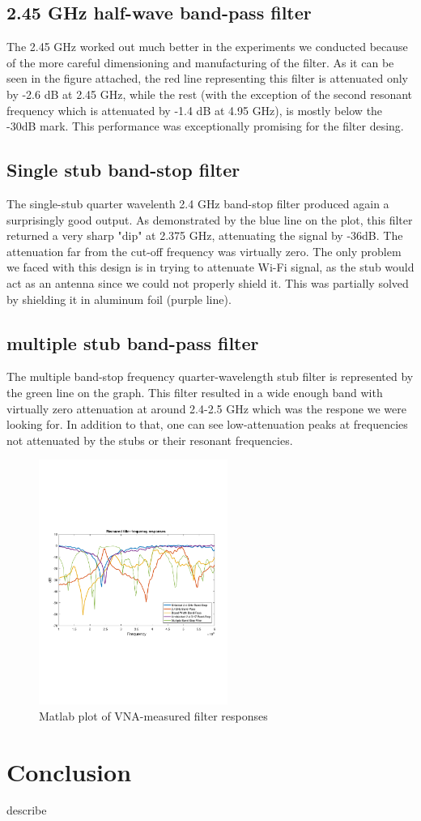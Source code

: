 \documentclass[letterpaper, 11pt, twocolumn]{article}
\begin{document}
\subsection{2.45 GHz half-wave band-pass filter}
The 2.45 GHz worked out much better in the experiments we conducted because of the more careful dimensioning and manufacturing of the filter. As it can be seen in the figure attached, the red line representing this filter is attenuated only by -2.6 dB at 2.45 GHz, while the rest (with the exception of the second resonant frequency which is attenuated by -1.4 dB at 4.95 GHz), is mostly below the -30dB mark. This performance was exceptionally promising for the filter desing.  


\subsection{Single stub band-stop filter}
The single-stub quarter wavelenth 2.4 GHz band-stop filter produced again a surprisingly good output. As demonstrated by the blue line on the plot, this filter returned a very sharp "dip" at 2.375 GHz, attenuating the signal by -36dB. The attenuation far from the cut-off frequency was virtually zero. The only problem we faced with this design is in trying to attenuate Wi-Fi signal, as the stub would act as an antenna since we could not properly shield it. This was partially solved by shielding it in aluminum foil (purple line). 

\subsection{multiple stub band-pass filter}
The multiple band-stop frequency quarter-wavelength stub filter is represented by the green line on the graph. This filter resulted in a wide enough band with virtually zero attenuation at around 2.4-2.5 GHz which was the respone we were looking for. In addition to that, one can see low-attenuation peaks at frequencies not attenuated by the stubs or their resonant frequencies. 

\begin{figure}[H]
    \centering
    \includegraphics[trim={0.5cm, 7.8cm, 0.2cm, 8cm}, clip=true, width=0.55\textwidth]{graph.pdf}
    \caption{Matlab plot of VNA-measured filter responses}
\end{figure}
\section{Conclusion}
describe
\end{document}
